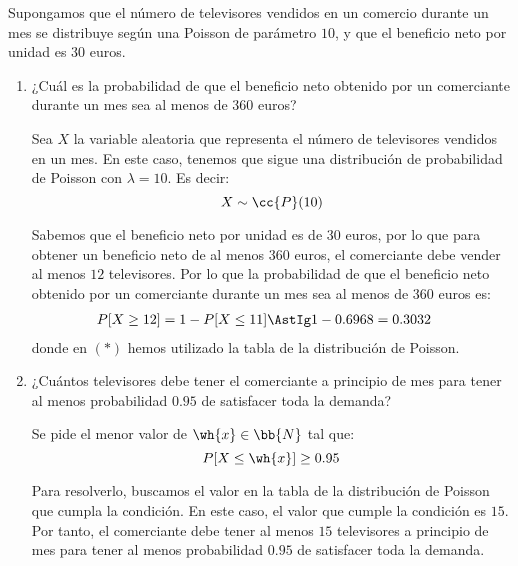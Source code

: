 \begin{ejercicio}
    Supongamos que el número de televisores vendidos en un comercio durante un mes se distribuye
    según una Poisson de parámetro $10$, y que el beneficio neto por unidad es $30$ euros.
    \begin{enumerate}
        \item ¿Cuál es la probabilidad de que el beneficio neto obtenido por un comerciante durante un mes
        sea al menos de $360$ euros?

        Sea $X$ la variable aleatoria que representa el número de televisores vendidos en un mes. En este caso, tenemos que sigue una distribución de probabilidad de Poisson con $\lambda=10$. Es decir:
        \begin{equation*}
            X \sim \cc{P}(10)
        \end{equation*}

        Sabemos que el beneficio neto por unidad es de $30$ euros, por lo que para obtener un beneficio neto de al menos $360$ euros, el comerciante debe vender al menos $12$ televisores. Por lo que la probabilidad de que el beneficio neto obtenido por un comerciante durante un mes sea al menos de $360$ euros es:
        \begin{align*}
            P[X\geq 12] &= 1 - P[X\leq 11] \AstIg 1-0.6968 = 0.3032
        \end{align*}
        donde en $(\ast)$ hemos utilizado la tabla de la distribución de Poisson.

        \item ¿Cuántos televisores debe tener el comerciante a principio de mes para tener al menos probabilidad $0.95$ de satisfacer toda la demanda?
        
        Se pide el menor valor de $\wh{x}\in \bb{N}$ tal que:
        \begin{equation*}
            P[X\leq \wh{x}] \geq 0.95
        \end{equation*}

        Para resolverlo, buscamos el valor en la tabla de la distribución de Poisson que cumpla la condición. En este caso, el valor que cumple la condición es $15$. Por tanto, el comerciante debe tener al menos $15$ televisores a principio de mes para tener al menos probabilidad $0.95$ de satisfacer toda la demanda.
    \end{enumerate}

\end{ejercicio}
